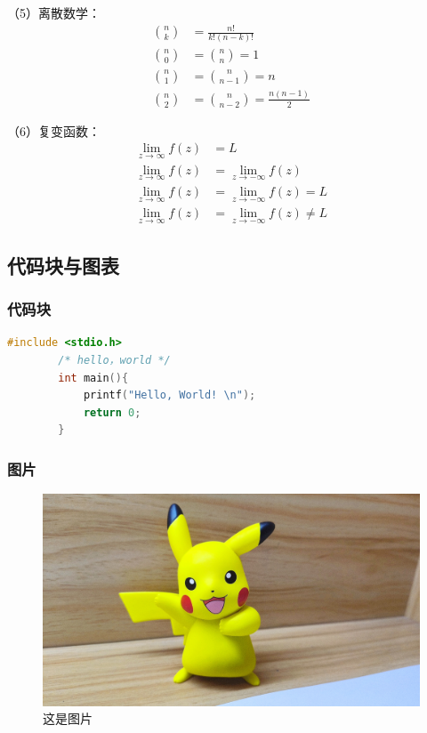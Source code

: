 \begin{ujnbody}
    （5）离散数学：
    \begin{equation}
        \begin{split}
            \binom{n}{k} &= \frac{n!}{k!(n-k)!} \\
            \binom{n}{0} &= \binom{n}{n} = 1 \\
            \binom{n}{1} &= \binom{n}{n-1} = n \\
            \binom{n}{2} &= \binom{n}{n-2} = \frac{n(n-1)}{2}
        \end{split}
    \end{equation}

    （6）复变函数：
    \begin{equation}
        \begin{split}
            \lim_{z \to \infty}f(z) &= L \\
            \lim_{z \to \infty}f(z) &= \lim_{z \to -\infty}f(z) \\
            \lim_{z \to \infty}f(z) &= \lim_{z \to -\infty}f(z) = L \\
            \lim_{z \to \infty}f(z) &= \lim_{z \to -\infty}f(z) \neq L
        \end{split}
    \end{equation}
    \subsection{代码块与图表}
    \subsubsection{代码块}
    \begin{lstlisting}[language=C]
        #include <stdio.h>
        /* hello，world */
        int main(){
            printf("Hello, World! \n"); 
            return 0;
        }
    \end{lstlisting}
    \subsubsection{图片}
    \begin{figure}[htbp]
        \centering
        \includegraphics[scale=0.1]{figures/pikachu.jpg}
        \caption{这是图片}
        \label{fig:1}
    \end{figure}

\end{ujnbody}
